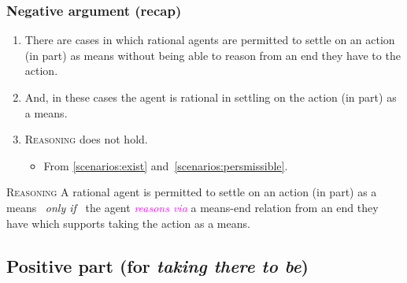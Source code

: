 \documentclass[noamssymb,
graphics,
]{beamer} %
\newcommand{\hand}{\ding{43}}
\newcommand{\schemaName}[1]{\textsc{#1}}
\newcommand{\hozlinedash}[0]{
  \noindent\hdashrule[0.5ex][c]{\textwidth}{.1pt}{2.5pt}
}
\begin{document}
\begin{frame}
  \frametitle{Negative argument (recap)}

  {%
  \begin{enumerate}
    \item There are cases in which rational agents are permitted to settle on an action (in part) as means without being able to reason from an end they have to the action.
  \item And, in these cases the agent is rational in settling on the action (in part) as a means.
  \item \schemaName{Reasoning} does not hold.
    \begin{itemize}
    \item From \ref{scenarios:exist} and~\ref{scenarios:persmissible}.
    \end{itemize}
  \end{enumerate}
  }

  \hozlinedash
  {%
    \begin{block}{\schemaName{Reasoning}}
      A rational agent is permitted to settle on an action (in part) as a means
      \newline
      \mbox{ }\hfill\emph{only if}\hfill\mbox{ }
      \newline
      the agent \textcolor{fuchsia}{\emph{reasons via}} a means-end relation from an end they have which supports taking the action as a means.
    \end{block}
  }
\end{frame}

\subsection{Positive part (for \emph{taking there to be})}%
\label{sec:positive}
\end{document}
